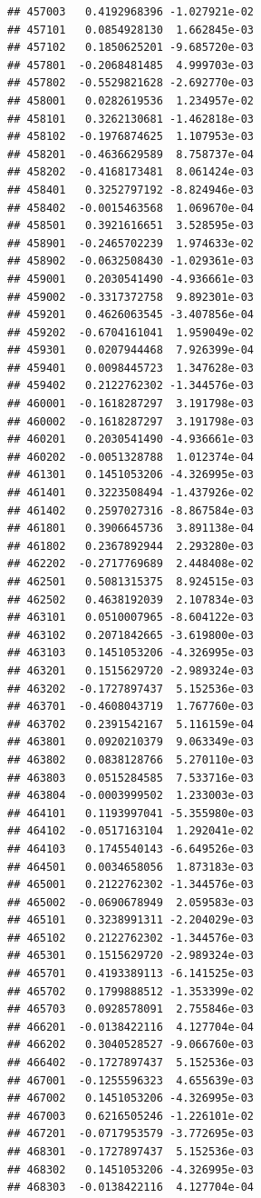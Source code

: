 \begin{frame}[fragile]
\begin{verbatim}
## 457003   0.4192968396 -1.027921e-02
## 457101   0.0854928130  1.662845e-03
## 457102   0.1850625201 -9.685720e-03
## 457801  -0.2068481485  4.999703e-03
## 457802  -0.5529821628 -2.692770e-03
## 458001   0.0282619536  1.234957e-02
## 458101   0.3262130681 -1.462818e-03
## 458102  -0.1976874625  1.107953e-03
## 458201  -0.4636629589  8.758737e-04
## 458202  -0.4168173481  8.061424e-03
## 458401   0.3252797192 -8.824946e-03
## 458402  -0.0015463568  1.069670e-04
## 458501   0.3921616651  3.528595e-03
## 458901  -0.2465702239  1.974633e-02
## 458902  -0.0632508430 -1.029361e-03
## 459001   0.2030541490 -4.936661e-03
## 459002  -0.3317372758  9.892301e-03
## 459201   0.4626063545 -3.407856e-04
## 459202  -0.6704161041  1.959049e-02
## 459301   0.0207944468  7.926399e-04
## 459401   0.0098445723  1.347628e-03
## 459402   0.2122762302 -1.344576e-03
## 460001  -0.1618287297  3.191798e-03
## 460002  -0.1618287297  3.191798e-03
## 460201   0.2030541490 -4.936661e-03
## 460202  -0.0051328788  1.012374e-04
## 461301   0.1451053206 -4.326995e-03
## 461401   0.3223508494 -1.437926e-02
## 461402   0.2597027316 -8.867584e-03
## 461801   0.3906645736  3.891138e-04
## 461802   0.2367892944  2.293280e-03
## 462202  -0.2717769689  2.448408e-02
## 462501   0.5081315375  8.924515e-03
## 462502   0.4638192039  2.107834e-03
## 463101   0.0510007965 -8.604122e-03
## 463102   0.2071842665 -3.619800e-03
## 463103   0.1451053206 -4.326995e-03
## 463201   0.1515629720 -2.989324e-03
## 463202  -0.1727897437  5.152536e-03
## 463701  -0.4608043719  1.767760e-03
## 463702   0.2391542167  5.116159e-04
## 463801   0.0920210379  9.063349e-03
## 463802   0.0838128766  5.270110e-03
## 463803   0.0515284585  7.533716e-03
## 463804  -0.0003999502  1.233003e-03
## 464101   0.1193997041 -5.355980e-03
## 464102  -0.0517163104  1.292041e-02
## 464103   0.1745540143 -6.649526e-03
## 464501   0.0034658056  1.873183e-03
## 465001   0.2122762302 -1.344576e-03
## 465002  -0.0690678949  2.059583e-03
## 465101   0.3238991311 -2.204029e-03
## 465102   0.2122762302 -1.344576e-03
## 465301   0.1515629720 -2.989324e-03
## 465701   0.4193389113 -6.141525e-03
## 465702   0.1799888512 -1.353399e-02
## 465703   0.0928578091  2.755846e-03
## 466201  -0.0138422116  4.127704e-04
## 466202   0.3040528527 -9.066760e-03
## 466402  -0.1727897437  5.152536e-03
## 467001  -0.1255596323  4.655639e-03
## 467002   0.1451053206 -4.326995e-03
## 467003   0.6216505246 -1.226101e-02
## 467201  -0.0717953579 -3.772695e-03
## 468301  -0.1727897437  5.152536e-03
## 468302   0.1451053206 -4.326995e-03
## 468303  -0.0138422116  4.127704e-04

\end{verbatim}
\end{frame}
